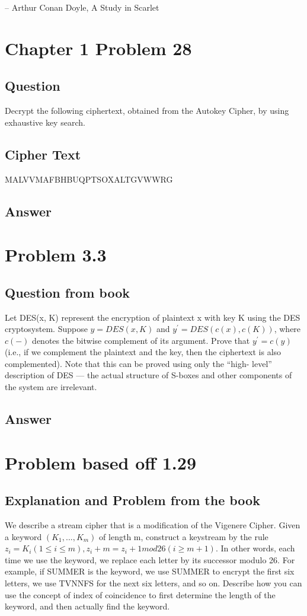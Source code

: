 \documentclass[10pt]{article}
\begin{document}
-- Arthur Conan Doyle, A Study in Scarlet

\section{Chapter 1 Problem 28}
\subsection{Question}
Decrypt the following ciphertext, obtained from the Autokey Cipher, by using exhaustive
key search.

\subsection{Cipher Text}
MALVVMAFBHBUQPTSOXALTGVWWRG

\subsection{Answer}


\section{Problem 3.3}
\subsection{Question from book}
Let DES(x, K) represent the encryption of plaintext x with key K using the DES
cryptosystem. Suppose $y = DES (x, K)$ and $y^\prime  = DES (c(x), c(K))$, where $c(-)$ denotes the bitwise
complement of its argument. Prove that $y^\prime  = c(y)$ (i.e., if we complement the plaintext and the
key, then the ciphertext is also complemented). Note that this can be proved using only the “high-
level” description of DES — the actual structure of S-boxes and other components of the system
are irrelevant.

\subsection{Answer}




\section{Problem based off 1.29}
\subsection{Explanation and Problem from the book}
We describe a stream cipher that is a modification of the Vigenere Cipher. Given a keyword
$(K_{1}, . . . , K_{m})$ of length m, construct a keystream by the rule 
$z_{i} = K_{i} (1 ≤ i ≤ m), z_{i} + m = z_{i} + 1 mod 26 (i \geq m + 1)$. In other words, each time we use the keyword, we replace each letter by its
successor modulo 26. For example, if SUMMER is the keyword, we use SUMMER to encrypt the
first six letters, we use TVNNFS for the next six letters, and so on.
Describe how you can use the concept of index of coincidence to first determine the length of the
keyword, and then actually find the keyword.
\end{document}
